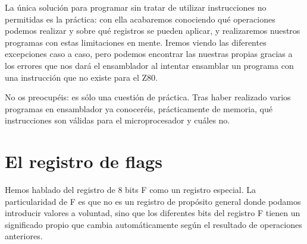 \documentclass[letterpaper,10pt,spanish]{sphinxmanual}
\begin{document}
\begin{sphinxVerbatim}[commandchars=\\\{\}]
        

        

       

        

        

        
\end{sphinxVerbatim}

La única solución para programar sin tratar de utilizar instrucciones no permitidas es la práctica: con ella acabaremos conociendo qué operaciones podemos realizar y sobre qué registros se pueden aplicar, y realizaremos nuestros programas con estas limitaciones en mente. Iremos viendo las diferentes excepciones caso a caso, pero podemos encontrar las nuestras propias gracias a los errores que nos dará el ensamblador al intentar ensamblar un programa con una instrucción que no existe para el Z80.

No os preocupéis: es sólo una cuestión de práctica. Tras haber realizado varios programas en ensamblador ya conoceréis, prácticamente de memoria, qué instrucciones son válidas para el microprocesador y cuáles no.


\section{El registro de flags}
\label{\detokenize{04_lenguaje_ensamblador_01/lenguaje_ensamblador_01:el-registro-de-flags}}
Hemos hablado del registro de 8 bits F como un registro especial. La particularidad de F es que no es un registro de propósito general donde podamos introducir valores a voluntad, sino que los diferentes bits del registro F tienen un significado propio que cambia automáticamente según el resultado de operaciones anteriores.
\end{document}
